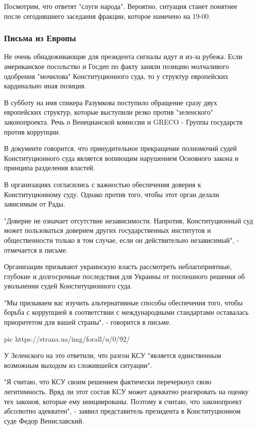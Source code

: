 Посмотрим, что ответят "слуги народа". Вероятно, ситуация станет понятнее после
сегодняшнего заседания фракции, которое намечено на 19-00.

\subsubsection{Письма из Европы}

Не очень обнадеживающие для президента сигналы идут и из-за рубежа. Если
американское посольство и Госдеп по факту заняли позицию молчаливого одобрения
"мочилова" Конституционного суда, то у структур европейских кардинально иная
позиция. 

В субботу на имя спикера Разумкова поступило обращение сразу двух европейских
структур, которые выступили резко против "зеленского" законопроекта. Речь о
Венецианской комиссии и GRECO - Группы государств против коррупции. 

В документе говорится, что принудительное прекращение полномочий судей
Конституционного суда является вопиющим нарушением Основного закона и принципа
разделения властей.

В организациях согласились с важностью обеспечения доверия к Конституционному
суду. Однако против того, чтобы этот орган делали зависимым от Рады. 

"Доверие не означает отсутствие независимости. Напротив, Конституционный суд
может пользоваться доверием других государственных институтов и общественности
только в том случае, если он действительно независимый", - отмечается в письме.

Организации призывают украинскую власть рассмотреть неблагоприятные, глубокие и
долгосрочные последствия для Украины от поспешного решения об увольнении судей
Конституционного суда.

"Мы призываем вас изучить альтернативные способы обеспечения того, чтобы борьба
с коррупцией в соответствии с международными стандартами оставалась приоритетом
для вашей страны", - говорится в письме.

\ifcmt
pic https://strana.ua/img/forall/u/0/92/%
\fi

У Зеленского на это ответили, что разгон КСУ "является единственным возможным
выходом из сложившейся ситуации". 

"Я считаю, что КСУ своим решением фактически перечеркнул свою легитимность.
Вряд ли этот состав КСУ может адекватно реагировать на оценку тех законов,
которые ему инициированы. Поэтому я считаю, что законопроект абсолютно
адекватен", - заявил представитель президента в Конституционном суде Федор
Вениславский. 

